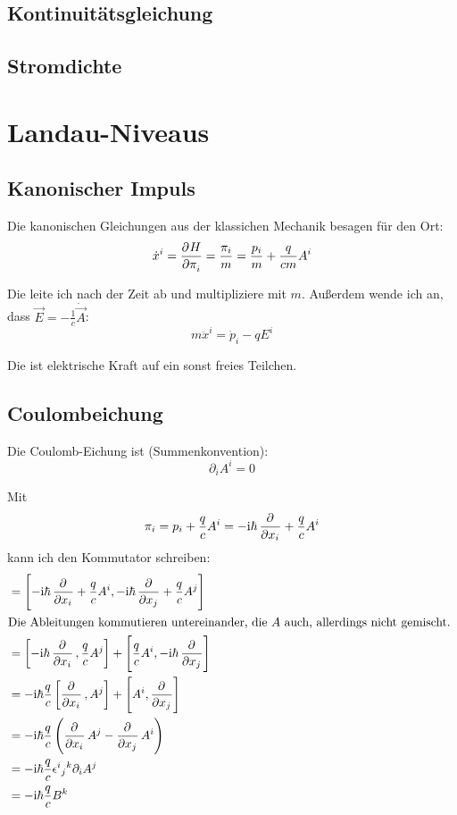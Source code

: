 \subsection{Kontinuitätsgleichung}
\subsection{Stromdichte}


\section{Landau-Niveaus}

\subsection{Kanonischer Impuls}

Die kanonischen Gleichungen aus der klassichen Mechanik besagen für den Ort:
\[
	\dot x^i = \dpd H{\pi_i} = \frac{\pi_i}m = \frac{p_i}m + \frac q{cm} A^i
\]

Die leite ich nach der Zeit ab und multipliziere mit $m$. Außerdem wende ich
an, dass $\vec E = - \frac 1c \dot{\vec A}$:
\[
	m \ddot x^i = \dot p_i - q E^i
\]

Die ist elektrische Kraft auf ein sonst freies Teilchen.

\subsection{Coulombeichung}

Die Coulomb-Eichung ist (Summenkonvention):
\[
	\partial_i A^i = 0
\]

Mit
\[
	\pi_i = p_i + \frac qc A^i
	= - \ii \hbar \dpd{}{{x_i}} + \frac qc A^i
\]
kann ich den Kommutator schreiben:
\begin{align*}
	[\pi_i, \pi_j]
	&= \sbr{-\ii \hbar \dpd{}{{x_i}} + \frac qc A^i, -\ii \hbar \dpd{}{{x_j}} + \frac qc A^j} \\
	\intertext{%
		Die Ableitungen kommutieren untereinander, die $A$ auch, allerdings
		nicht gemischt.
	}
	&= \sbr{-\ii \hbar \dpd{}{{x_i}}, \frac qc A^j} + \sbr{\frac qc A^i, -\ii \hbar \dpd{}{{x_j}}} \\
	&= -\ii \hbar \frac qc \sbr{\dpd{}{{x_i}}, A^j} + \sbr{A^i, \dpd{}{{x_j}}} \\
	&= - \ii \hbar \frac qc \del{\dpd{}{{x_i}} A^j - \dpd{}{{x_j}} A^i} \\
	&= - \ii \hbar \frac qc \epsilon^i{}_j{}^k \partial_i A^j \\
	&= - \ii \hbar \frac qc B^k
\end{align*}

